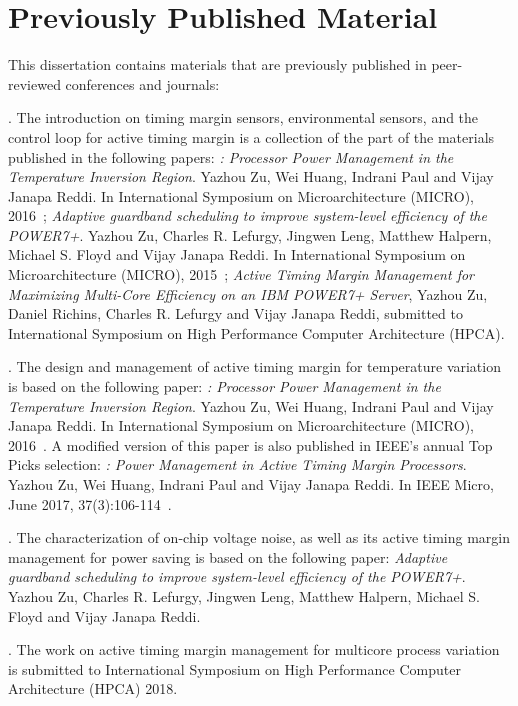 \section{Previously Published Material}
\label{sec:intro:prev}

This dissertation contains materials that are previously published in peer-reviewed conferences and journals:

\textbf{}. The introduction on timing margin sensors, environmental sensors, and the control loop for active timing margin is a collection of the part of the materials published in the following papers: \textit{\tistates: Processor Power Management in the Temperature Inversion Region}. Yazhou Zu, Wei Huang, Indrani Paul and Vijay Janapa Reddi. In International Symposium on Microarchitecture (MICRO), 2016~\cite{zu2016tistate}; \textit{Adaptive guardband scheduling to improve system-level efficiency of the POWER7+}. Yazhou Zu, Charles R. Lefurgy, Jingwen Leng, Matthew Halpern, Michael S. Floyd and Vijay Janapa Reddi. In International Symposium on Microarchitecture (MICRO), 2015~\cite{zu2015adaptive}; \textit{Active Timing Margin Management for Maximizing Multi-Core Efficiency on an IBM POWER7+ Server}, Yazhou Zu, Daniel Richins, Charles R. Lefurgy and Vijay Janapa Reddi, submitted to International Symposium on High Performance Computer Architecture (HPCA).

\textbf{}. The design and management of active timing margin for temperature variation is based on the following paper: \textit{\tistates: Processor Power Management in the Temperature Inversion Region}. Yazhou Zu, Wei Huang, Indrani Paul and Vijay Janapa Reddi. In International Symposium on Microarchitecture (MICRO), 2016~\cite{zu2016tistate}. A modified version of this paper is also published in IEEE's annual Top Picks selection: \textit{\tistates: Power Management in Active Timing Margin Processors}. Yazhou Zu, Wei Huang, Indrani Paul and Vijay Janapa Reddi. In IEEE Micro, June 2017, 37(3):106-114~\cite{zu2017ti}.

\textbf{}. The characterization of on-chip voltage noise, as well as its active timing margin management for power saving is based on the following paper: \textit{Adaptive guardband scheduling to improve system-level efficiency of the POWER7+}. Yazhou Zu, Charles R. Lefurgy, Jingwen Leng, Matthew Halpern, Michael S. Floyd and Vijay Janapa Reddi. 

\textbf{}. The work on active timing margin management for multicore process variation is submitted to International Symposium on High Performance Computer Architecture (HPCA) 2018.

